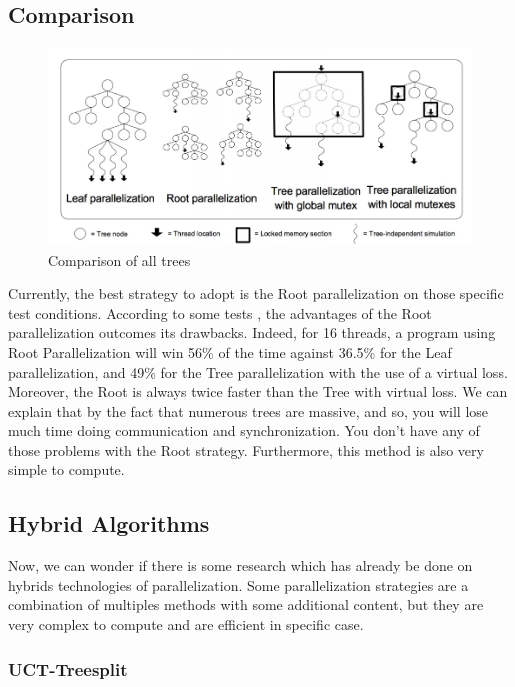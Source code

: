 \subsection{Comparison}
\begin{figure}[!h] 
\centerline{\includegraphics[scale=0.60]{2_State_of_the_art/Strategy_of_root_parallelization_Mikail/impara.png}}
   \caption{\label{étiquette} Comparison of all trees}
\label{comp_algo}
\end{figure}

Currently, the best strategy to adopt is the Root parallelization on those specific test conditions. According to some tests \cite{parallel_comp,tree_root_comp}, the advantages of the Root parallelization outcomes its drawbacks. Indeed, for 16 threads, a program using Root Parallelization will win 56\% of the time against 36.5\% for the Leaf parallelization, and 49\% for the Tree parallelization with the use of a virtual loss. Moreover, the Root is always twice faster than the Tree with virtual loss. We can explain that by the fact that numerous trees are massive, and so, you will lose much time doing communication and synchronization. You don’t have any of those problems with the Root strategy. Furthermore, this method is also very simple to compute.

\subsection{Hybrid Algorithms}

Now, we can wonder if there is some research which has already be done on hybrids technologies of parallelization. Some parallelization strategies are a combination of multiples methods with some additional content, but they are very complex to compute and are efficient in specific case.

\subsubsection{UCT-Treesplit}


